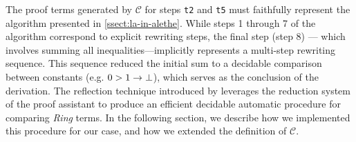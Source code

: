 The proof terms generated by $\mathcal{C}$ for steps \texttt{t2} and \texttt{t5} must faithfully represent the algorithm presented in \cref{ssect:la-in-alethe}.
While steps 1 through 7 of the algorithm correspond to explicit rewriting steps, the final step (step 8) — which involves summing all inequalities—implicitly represents a multi-step rewriting sequence.
This sequence reduced the initial sum to a decidable comparison between constants (e.g. $0 > 1 \rightarrow \bot$), which serves as the conclusion of the derivation. %
The reflection technique introduced by \cite{reflection-origin-coq} leverages the reduction system of the proof assistant to produce an efficient decidable automatic
procedure for comparing \emph{Ring} terms. In the following section, we describe how we implemented this procedure for our case, and how we extended the definition of $\mathcal{C}$.

